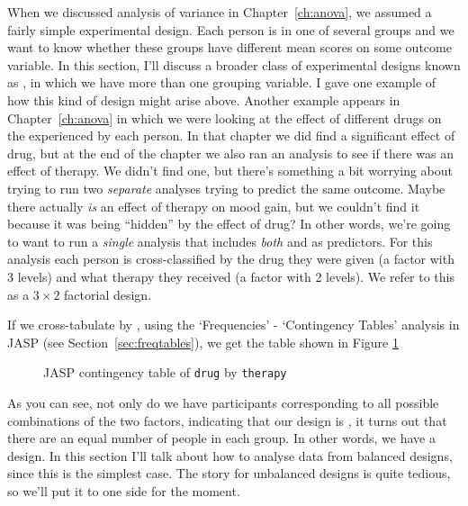 When we discussed analysis of variance in Chapter~\ref{ch:anova}, we assumed a fairly simple experimental design. Each person is in one of several groups and we want to know whether these groups have different mean scores on some outcome variable. In this section, I'll discuss a broader class of experimental designs known as , in which we have more than one grouping variable. I gave one example of how this kind of design might arise above. Another example appears in  Chapter~\ref{ch:anova} in which we were looking at the effect of different drugs on the  experienced by each person. In that chapter we did find a significant effect of drug, but at the end of the chapter we also ran an analysis to see if there was an effect of therapy. We didn't find one, but there's something a bit worrying about trying to run two {\it separate} analyses trying to predict the same outcome. Maybe there actually {\it is} an effect of therapy on mood gain, but we couldn't find it because it was being ``hidden'' by the effect of drug? In other words, we're going to want to run a {\it single} analysis that includes {\it both}  and  as predictors. For this analysis each person is cross-classified by the drug they were given (a factor with 3 levels) and what therapy they received (a factor with 2 levels). We refer to this as a $3 \times 2$ factorial design. 

If we cross-tabulate  by , using the `Frequencies' - `Contingency Tables' analysis in JASP (see Section~\ref{sec:freqtables}), we get the table shown in Figure \ref{fig:factorialanova1}

\begin{figure}[!htb]
\begin{center}
\caption{JASP contingency table of \texttt{drug} by \texttt{therapy}}
\label{fig:factorialanova1}
\HR
\end{center}
\end{figure}

As you can see, not only do we have participants corresponding to all possible combinations of the two factors, indicating that our design is , it turns out that there are an equal number of people in each group. In other words, we have a  design. In this section I'll talk about how to analyse data from balanced designs, since this is the simplest case. The story for unbalanced designs is quite tedious, so we'll put it to one side for the moment.

